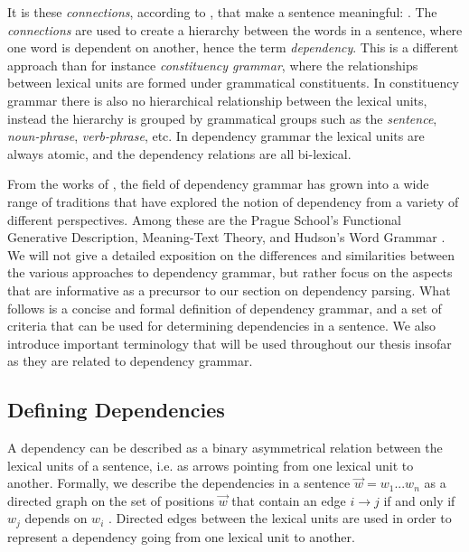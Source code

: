 It is these \textit{connections}, according to \citeauthor{Tes:15}, that make a sentence meaningful:  \cite{Tes:15}. The \textit{connections} are used to create a hierarchy between the words in a sentence, where one word is dependent on another, hence the term \textit{dependency}. This is a different approach than for instance \textit{constituency grammar}, where the relationships between lexical units are formed under grammatical constituents. In constituency grammar there is also no hierarchical relationship between the lexical units, instead the hierarchy is grouped by grammatical groups such as the \textit{sentence}, \textit{noun-phrase}, \textit{verb-phrase}, etc. In dependency grammar the lexical units are always atomic, and the dependency relations are all bi-lexical.

From the works of \citeauthor{Tes:15}, the field of dependency grammar has grown into a wide range of traditions that have explored the notion of dependency from a variety of different perspectives. Among these are the Prague School's Functional Generative Description, Meaning-Text Theory, and Hudson's Word Grammar \cite{Sgall:86, Mel:88, Hudson:90}. We will not give a detailed exposition on the differences and similarities between the various approaches to dependency grammar, but rather focus on the aspects that are informative as a precursor to our section on dependency parsing. What follows is a concise and formal definition of dependency grammar, and a set of criteria that can be used for determining dependencies in a sentence. We also introduce important terminology that will be used throughout our thesis insofar as they are related to dependency grammar.

\subsection{Defining Dependencies}
\label{definitions}

A dependency can be described as a binary asymmetrical relation between the lexical units of a sentence, i.e. as arrows pointing from one lexical unit to another. Formally, we describe the dependencies in a sentence $\vec{w} = w_1 ... w_n$ as a directed graph on the set of positions $\vec{w}$ that contain an edge $i \rightarrow j$ if and only if $w_j$ depends on $w_i$ \cite{Kuhl:10}. Directed edges between the lexical units are used in order to represent a dependency going from one lexical unit to another.

